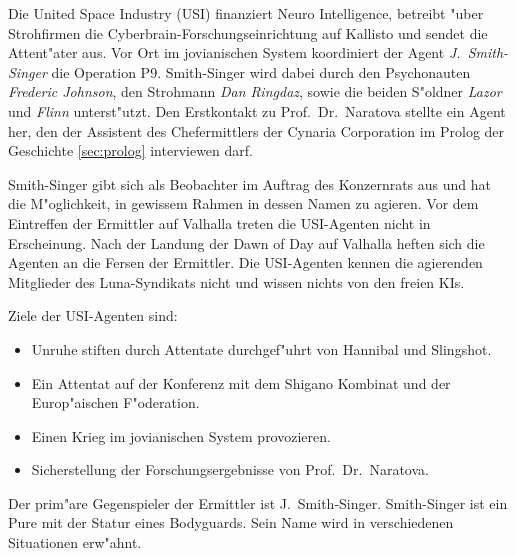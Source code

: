 
Die United Space Industry (USI) finanziert Neuro Intelligence, betreibt "uber Strohfirmen die Cyberbrain-Forschungseinrichtung auf Kallisto und sendet die Attent"ater aus. Vor Ort im jovianischen System koordiniert der Agent \emph{J.~Smith-Singer} die Operation P9. Smith-Singer wird dabei durch den Psychonauten \emph{Frederic Johnson}, den Strohmann \emph{Dan Ringdaz}, sowie die beiden S"oldner \emph{Lazor} und \emph{Flinn} unterst"utzt. Den Erstkontakt zu Prof.~Dr.~Naratova stellte ein Agent her, den der Assistent des Chefermittlers der Cynaria Corporation im Prolog der Geschichte \cref{sec:prolog} interviewen darf.

Smith-Singer gibt sich als Beobachter im Auftrag des Konzernrats aus und hat die M"oglichkeit, in gewissem Rahmen in dessen Namen zu agieren. Vor dem Eintreffen der Ermittler auf Valhalla treten die USI-Agenten nicht in Erscheinung. Nach der Landung der Dawn of Day auf Valhalla heften sich die Agenten an die Fersen der Ermittler. Die USI-Agenten kennen die agierenden Mitglieder des Luna-Syndikats nicht und wissen nichts von den freien KIs.

Ziele der USI-Agenten sind:

\begin{itemize}
    \item Unruhe stiften durch Attentate durchgef"uhrt von Hannibal und Slingshot.
    \item Ein Attentat auf der Konferenz mit dem Shigano Kombinat und der Europ"aischen F"oderation.
    \item Einen Krieg im jovianischen System provozieren.
    \item Sicherstellung der Forschungsergebnisse von  Prof.~Dr.~Naratova.
\end{itemize}

Der prim"are Gegenspieler der Ermittler ist J.~Smith-Singer. Smith-Singer ist ein Pure mit der Statur eines Bodyguards. Sein Name wird in verschiedenen Situationen erw"ahnt.

